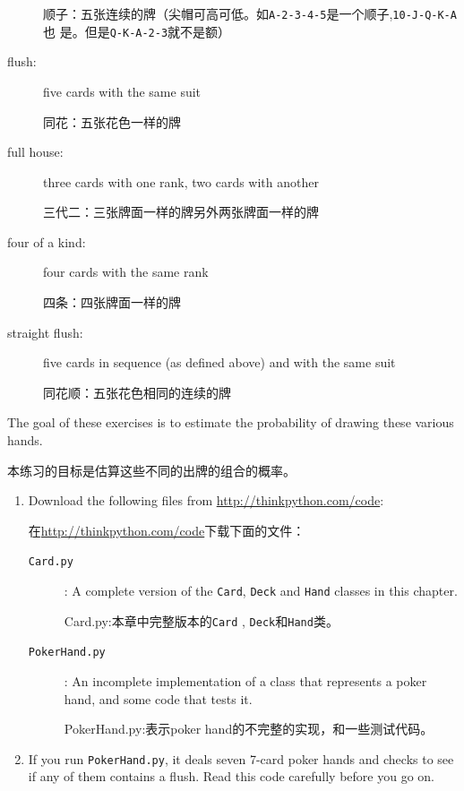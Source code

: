 \documentclass[10pt]{book}
\begin{document}
\begin{CJK}{UTF8}{gbsn}
\begin{exercise}
\begin{description}
顺子：五张连续的牌（尖帽可高可低。如{\tt A-2-3-4-5}是一个顺子,{\tt 10-J-Q-K-A}也
是。但是{\tt Q-K-A-2-3}就不是额）

\item[flush:] five cards with the same suit
\vspace{-0.05in}

同花：五张花色一样的牌

\item[full house:] three cards with one rank, two cards with another
\vspace{-0.05in}

三代二：三张牌面一样的牌另外两张牌面一样的牌

\item[four of a kind:] four cards with the same rank
\vspace{-0.05in}

四条：四张牌面一样的牌

\item[straight flush:] five cards in sequence (as defined above) and
with the same suit
\vspace{-0.05in}

同花顺：五张花色相同的连续的牌

\end{description}
%
The goal of these exercises is to estimate
the probability of drawing these various hands.

本练习的目标是估算这些不同的出牌的组合的概率。

\begin{enumerate}

\item Download the following files from \url{http://thinkpython.com/code}:

    在\url{http://thinkpython.com/code}下载下面的文件：

\begin{description}

\item[{\tt Card.py}]: A complete version of the {\tt Card},
{\tt Deck} and {\tt Hand} classes in this chapter.

Card.py:本章中完整版本的{\tt Card} , {\tt Deck}和{\tt Hand}类。

\item[{\tt PokerHand.py}]: An incomplete implementation of a class
that represents a poker hand, and some code that tests it.

PokerHand.py:表示poker hand的不完整的实现，和一些测试代码。

\end{description}
%
\item If you run {\tt PokerHand.py}, it deals seven 7-card poker hands
and checks to see if any of them contains a flush.  Read this
code carefully before you go on.


\end{enumerate}
\end{exercise}
\end{CJK}
\end{document}
